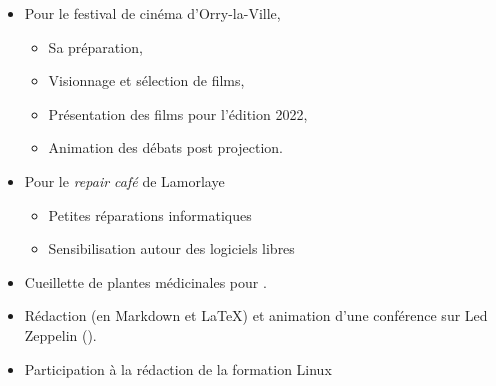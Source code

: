 \begin{itemize}
\begin{itemize}
\begin{itemize}
                    \item{\textit{Un Mari à la porte}, à Orry-la-Ville, le 22 juin 2025.}
                    \item{\textit{Le Cabaret du Styx}, à Orry-la-Ville, le 7 novembre 2025.}
                    \item{\textit{Les Trois Ténors au Ciné, le retour}, à Orry-la-Ville, le 25 janvier 2024.}
                \end{itemize}
        \end{itemize}
    \item{Pour le festival de cinéma  d’Orry-la-Ville,}
        \begin{itemize}
            \item{Sa préparation,}
            \item{Visionnage et sélection de films,}
            \item{Présentation des films pour l'édition 2022,}
            \item{Animation des débats post projection.}
        \end{itemize}
    \item{Pour le \textit{repair café}  de Lamorlaye}
        \begin{itemize}
            \item{Petites réparations informatiques}
            \item{Sensibilisation autour des logiciels libres}
        \end{itemize}
    \item{Cueillette de plantes médicinales pour }.
    \item{Rédaction (en Markdown et \LaTeX) et animation d'une conférence sur Led Zeppelin ().}
    \item{Participation à la rédaction de la formation Linux }
\end{itemize}

\closesection{}
